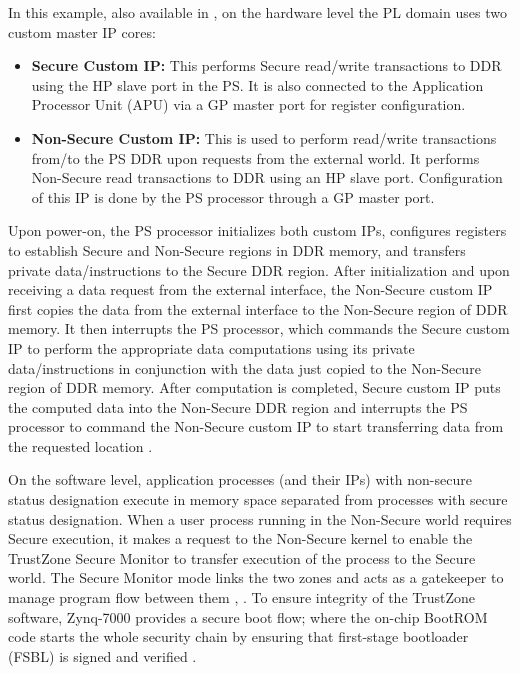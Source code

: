 \documentclass[sigconf]{acmart}
\theoremstyle{plain}
\theoremstyle{remark}
\begin{document}
In this example, also available in \cite{xilinxtrust}, on the hardware level the PL domain uses two custom master IP cores:

\begin{itemize}
\item \textbf{Secure Custom IP:}
This performs Secure read/write transactions to DDR using the HP slave port in the PS. It is also connected to the Application Processor Unit (APU) via a GP master port for register configuration.
\item \textbf{Non-Secure Custom IP:}
This is used to perform read/write transactions from/to the PS DDR upon requests from the external world. It performs Non-Secure read transactions to DDR using an HP slave port. Configuration of this IP is done by the PS processor through a GP master port.
\end{itemize}

Upon power-on, the PS processor initializes both custom IPs, configures registers to establish Secure and Non-Secure regions in DDR memory, and transfers private data/instructions to the Secure DDR region. After initialization and upon receiving a data request from the external interface, the Non-Secure custom IP first copies the data from the external interface to the Non-Secure region of DDR memory. It then interrupts the PS processor, which commands the Secure custom IP to perform the appropriate data computations using its private data/instructions in conjunction with the data just copied to the Non-Secure region of DDR memory. After computation is completed, Secure custom IP puts the computed data into the Non-Secure DDR region and interrupts the PS processor to command the Non-Secure custom IP to start transferring data from the requested location \cite{xilinxtrust}.

On the software level, application processes (and their IPs) with non-secure status designation execute in memory space separated from processes with secure status designation. When a user process running in the Non-Secure world requires Secure execution, it makes a request to the Non-Secure kernel to enable the TrustZone Secure Monitor to transfer execution of the process to the Secure world. The Secure Monitor mode links the two zones and acts as a gatekeeper to manage program flow between them \cite{xilinxprotrust}, \cite{xilinxtrust}. To ensure integrity of the TrustZone software, Zynq-7000 provides a secure boot flow; where the on-chip BootROM code starts the whole security chain by ensuring that first-stage bootloader (FSBL) is signed and verified \cite{xilinxtrust}.
\end{document}
